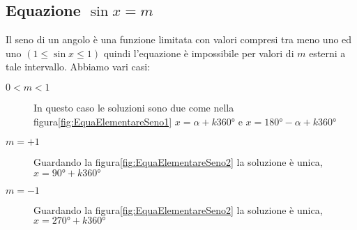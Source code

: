 \subsection{Equazione $\sin x=m$}
Il seno di un angolo è una funzione limitata con valori compresi tra meno uno ed uno $(1\leq\sin x\leq 1)$ quindi l'equazione è impossibile per valori di $m$ esterni a tale intervallo. Abbiamo vari casi:
\begin{description}
	\item[$0<m<1$] In questo caso le soluzioni sono due come nella figura\nobs\vref{fig:EquaElementareSeno1} $x=\alpha+k\ang{360}$ e $x=\ang{180}-\alpha+k\ang{360}$
	\item [$m=+1$] Guardando la figura\nobs\vref{fig:EquaElementareSeno2} la soluzione  è unica, $x=\ang{90}+k\ang{360}$
	\item [$m=-1$] Guardando la figura\nobs\vref{fig:EquaElementareSeno2} la soluzione  è unica, $x=\ang{270}+k\ang{360}$
\end{description} 
\begin{figure}
	\begin{subfigure}[b]{.5\linewidth}
		\centering
			
			\label{fig:EquaElementareSeno1}
	\end{subfigure}%
	\begin{subfigure}[b]{.5\linewidth}
		\centering
		
		\label{fig:EquaElementareCoseno1}
	\end{subfigure}
	\label{fig:EquaElementareSenoCoseno}
\end{figure}
\begin{figure}
	\begin{subfigure}[b]{.5\linewidth}
		\centering
			
			\label{fig:EquaElementareSeno4}
	\end{subfigure}%
	\begin{subfigure}[b]{.5\linewidth}
		\centering
		
		\label{fig:EquaElementareCoseno4}
	\end{subfigure}
	\label{fig:EquaElementareSenoCoseno2}
\end{figure}
